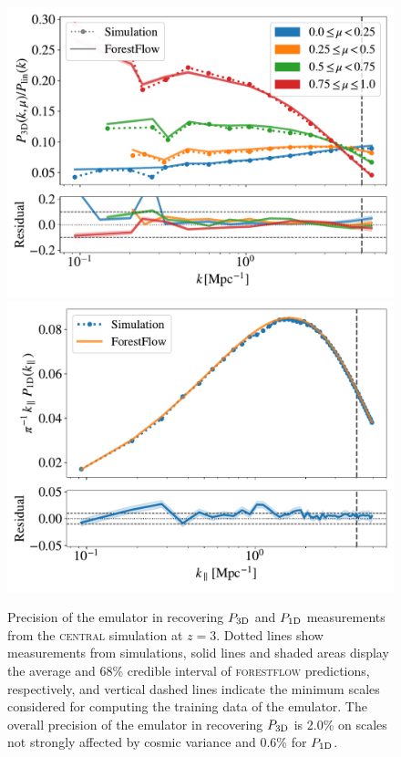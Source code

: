 \documentclass{aa}
\newcommand{\poned}{\ensuremath{P_{\rm 1D}}\xspace}
\newcommand{\pthreed}{\ensuremath{P_{\rm 3D}}\xspace}
\newcommand{\forestflow}{\textsc{forestflow}\xspace}
\newcommand{\simcentral}{\textsc{central}\xspace}
\begin{document}
\begin{figure}
\includegraphics[width= 0.95\columnwidth]{figures/p3d_snap.pdf}
\includegraphics[width= 0.97\columnwidth]{figures/p1d_snap.pdf}
\centering
\caption{Precision of the emulator in recovering \pthreed and \poned measurements from the \simcentral simulation at $z=3$. Dotted lines show measurements from simulations, solid lines and shaded areas display the average and 68\% credible interval of \forestflow predictions, respectively, and vertical dashed lines indicate the minimum scales considered for computing the training data of the emulator. The overall precision of the emulator in recovering \pthreed is 2.0\% on scales not strongly affected by cosmic variance and 0.6\% for \poned.
}
\label{fig:test_snap}
\end{figure}
\end{document}
